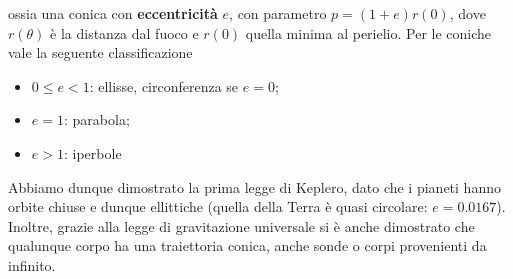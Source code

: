 \documentclass[a4paper, oneside]{book}
\begin{document}
ossia una conica con \textbf{eccentricità} 
$e$, con parametro $p = (1 + e) r(0)$, dove $r(\theta)$ è la distanza 
dal fuoco e $r(0)$ quella minima al perielio. Per le coniche vale la seguente 
classificazione 
\begin{itemize}
    \item $0 \leq e < 1$: ellisse, circonferenza se $e = 0$; 
    \item $e = 1$: parabola;
    \item $e > 1$: iperbole
\end{itemize}
Abbiamo dunque dimostrato la prima legge di Keplero, dato che 
i pianeti hanno orbite chiuse e dunque ellittiche
(quella della Terra è quasi circolare: $e = 0.0167$). Inoltre, 
grazie alla legge di gravitazione universale si è anche 
dimostrato che qualunque corpo ha una traiettoria conica, 
anche sonde o corpi provenienti da infinito.
\end{document}
